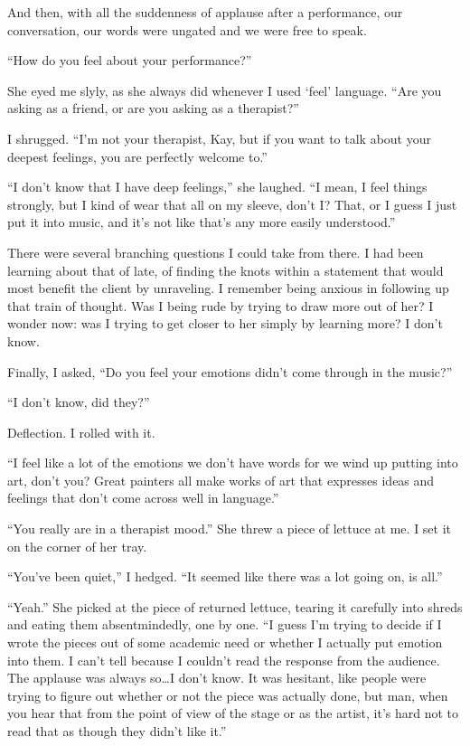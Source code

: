 And then, with all the suddenness of applause after a performance, our conversation, our words were ungated and we were free to speak.

``How do you feel about your performance?''

She eyed me slyly, as she always did whenever I used `feel' language. ``Are you asking as a friend, or are you asking as a therapist?''

I shrugged. ``I'm not your therapist, Kay, but if you want to talk about your deepest feelings, you are perfectly welcome to.''

``I don't know that I have deep feelings,'' she laughed. ``I mean, I feel things strongly, but I kind of wear that all on my sleeve, don't I? That, or I guess I just put it into music, and it's not like that's any more easily understood.''

There were several branching questions I could take from there. I had been learning about that of late, of finding the knots within a statement that would most benefit the client by unraveling. I remember being anxious in following up that train of thought. Was I being rude by trying to draw more out of her? I wonder now: was I trying to get closer to her simply by learning more? I don't know.

Finally, I asked, ``Do you feel your emotions didn't come through in the music?''

``I don't know, did they?''

Deflection. I rolled with it.

``I feel like a lot of the emotions we don't have words for we wind up putting into art, don't you? Great painters all make works of art that expresses ideas and feelings that don't come across well in language.''

``You really are in a therapist mood.'' She threw a piece of lettuce at me. I set it on the corner of her tray.

``You've been quiet,'' I hedged. ``It seemed like there was a lot going on, is all.''

``Yeah.'' She picked at the piece of returned lettuce, tearing it carefully into shreds and eating them absentmindedly, one by one. ``I guess I'm trying to decide if I wrote the pieces out of some academic need or whether I actually put emotion into them. I can't tell because I couldn't read the response from the audience. The applause was always so\ldots I don't know. It was hesitant, like people were trying to figure out whether or not the piece was actually done, but man, when you hear that from the point of view of the stage or as the artist, it's hard not to read that as though they didn't like it.''

